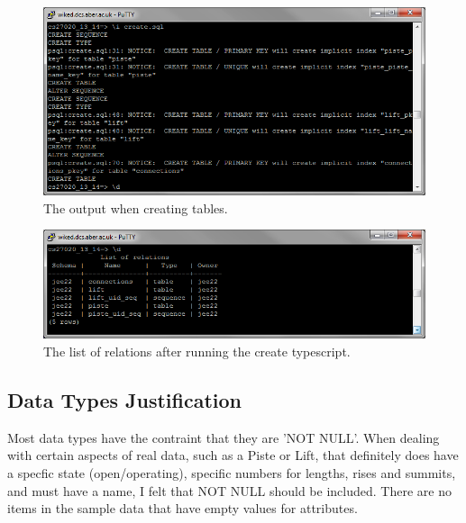 \documentclass[11pt]{scrartcl} %
\begin{document}
\begin{figure}[H]
  \centering
    \includegraphics[width=1\textwidth]{IMG/create_tables.png}
 \caption{The output when creating tables.}
\end{figure}
\begin{figure}[H]
  \centering
    \includegraphics[width=1\textwidth]{IMG/completed_tables.png}
 \caption{The list of relations after running the create typescript.}
\end{figure}

\subsection{Data Types Justification}
Most data types have the contraint that they are 'NOT NULL'. When dealing with certain aspects of real data, such as a Piste or Lift, that definitely does have a specfic state (open/operating), specific numbers for lengths, rises and summits, and must have a name, I felt that NOT NULL should be included. There are no items in the sample data that have empty values for attributes.
\end{document}
